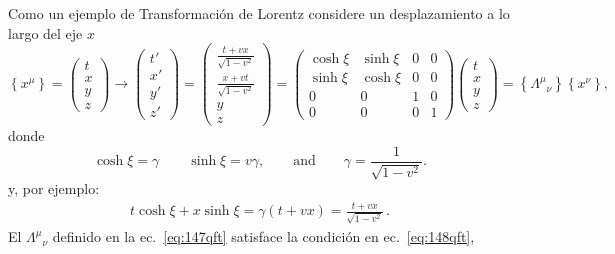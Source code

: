 Como un ejemplo de Transformación de Lorentz considere un desplazamiento a lo largo del eje $x$
\begin{equation}
\label{eq:147qft}
  \left\{x^\mu\right\}=\begin{pmatrix}
    t\\
    x\\
    y\\
    z
  \end{pmatrix}\to
  \begin{pmatrix}
    t'\\
    x'\\
    y'\\
    z'
  \end{pmatrix}=
  \begin{pmatrix}
    \frac{t+vx}{\sqrt{1-v^2}}\\
    \frac{x+vt}{\sqrt{1-v^2}}\\
    y\\
    z
  \end{pmatrix}=
  \begin{pmatrix}
    \cosh\xi&\sinh\xi&0&0\\
    \sinh\xi&\cosh\xi&0&0\\
    0     &  0  &1&0\\
    0     &  0  &0&1
  \end{pmatrix}
  \begin{pmatrix}
    t\\
    x\\
    y\\
    z
  \end{pmatrix}=\left\{{\Lambda^\mu}_{\nu}\right\}\left\{x^\nu\right\},
\end{equation}
donde
\begin{equation}
  \cosh\xi=\gamma\qquad\sinh\xi=v\gamma,\qquad\text{and}\qquad \gamma=\frac{1}{\sqrt{1-v^2}}.
\end{equation}
y, por ejemplo:
\begin{align}
  t\cosh{\xi}+x\sinh\xi=\gamma(t+v x)=\frac{t+v x}{\sqrt{1-v^2}}\,.
\end{align}
El ${\Lambda^\mu}_{\nu}$ definido en la ec.~\eqref{eq:147qft} satisface la condición en ec.~\eqref{eq:148qft}, 
